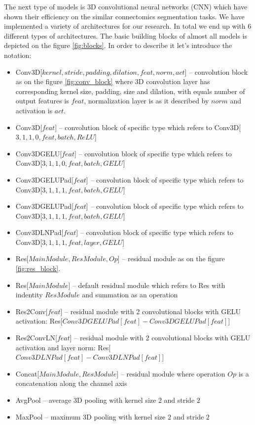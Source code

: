 \documentclass[twocolumn, a4paper]{article}
\theoremstyle{definition}
\begin{document}
The next type of models is 3D convolutional neural networks (CNN) which have shown their efficiency
on the similar connectomics segmentation tasks. We have implemented a variety of architectures for our
research. In total we end up with 6 different types of architectures.
The basic building blocks of almost all models is depicted on the figure \ref{fig:blocks}.
In order to describe it let's introduce the notation:
\begin{itemize}
    \itemsep0em
    \item Conv3D[\( kernel, stride, padding, dilation, feat, norm, act\)] -- convolution block as on the figure \ref{fig:conv_block}
          where 3D convolution layer has corresponding kernel size, padding, size and dilation, with  equals
          number of output features is \( feat \), normalization layer is
          as it described by \( norm \) and activation is \( act \).
    \item Conv3D[\( feat \)] -- convolution block of specific type which refers to
          Conv3D[\( 3, 1, 1, 0, feat, batch, ReLU \)]
    \item Conv3DGELU[\( feat \)] -- convolution block of specific type which refers to
          Conv3D[\( 3, 1, 1, 0, feat, batch, GELU \)]
    \item Conv3DGELUPad[\( feat \)] -- convolution block of specific type which refers to
          Conv3D[\( 3, 1, 1, 1, feat, batch, GELU \)]
    \item Conv3DGELUPad[\( feat \)] -- convolution block of specific type which refers to
          Conv3D[\( 3, 1, 1, 1, feat, batch, GELU \)]
    \item Conv3DLNPad[\( feat \)] -- convolution block of specific type which refers to
          Conv3D[\( 3, 1, 1, 1, feat, layer, GELU \)]
    \item Res[\( MainModule, ResModule, Op \)] -- residual module as on the figure \ref{fig:res_block}.
    \item Res[\( MainModule \)] -- default residual module which refers to Res with indentity \( ResModule \) and
          summation as an operation
    \item Res2Conv[\( feat \)] -- residual module with 2 convolutional blocks with GELU activation:
          Res[\( Conv3DGELUPad[feat] - Conv3DGELUPad[feat] \)]
    \item Res2ConvLN[\( feat \)] -- residual module with 2 convolutional blocks with GELU activation and layer norm:
          Res[\( Conv3DLNPad[feat] - Conv3DLNPad[feat] \)]
    \item Concat[\( MainModule, ResModule\)] -- residual module where operation \( Op \) is a concatenation along the channel axis
    \item AvgPool -- average 3D pooling with kernel size \( 2 \) and stride \( 2 \)
    \item MaxPool -- maximum 3D pooling with kernel size \( 2 \) and stride \( 2 \)
\end{itemize}
\end{document}
